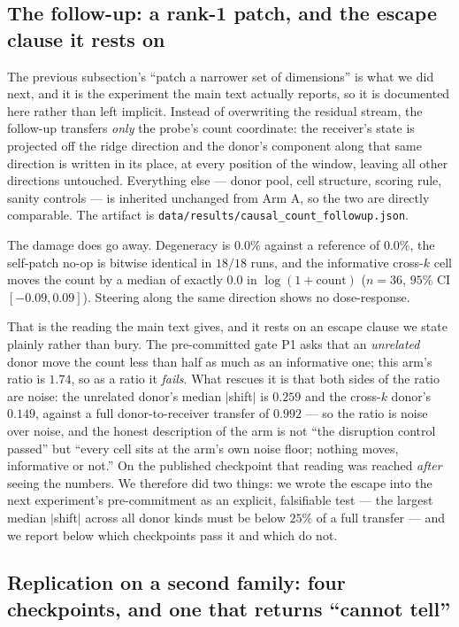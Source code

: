 \documentclass[11pt]{article}
\begin{document}
\subsection{The follow-up: a rank-1 patch, and the escape clause it rests on}

The previous subsection's ``patch a narrower set of dimensions'' is what we did
next, and it is the experiment the main text actually reports, so it is
documented here rather than left implicit. Instead of overwriting the residual
stream, the follow-up transfers \emph{only} the probe's count coordinate: the
receiver's state is projected off the ridge direction and the donor's component
along that same direction is written in its place, at every position of the
window, leaving all other directions untouched. Everything else --- donor pool,
cell structure, scoring rule, sanity controls --- is inherited unchanged from
Arm A, so the two are directly comparable. The artifact is
\texttt{data/results/causal\_count\_followup.json}.

The damage does go away. Degeneracy is $0.0\%$ against a reference of $0.0\%$,
the self-patch no-op is bitwise identical in $18/18$ runs, and the informative
cross-$k$ cell moves the count by a median of exactly $0.0$ in
$\log(1{+}\text{count})$ ($n{=}36$, $95\%$ CI $[-0.09,0.09]$). Steering along
the same direction shows no dose-response.

That is the reading the main text gives, and it rests on an escape clause we
state plainly rather than bury. The pre-committed gate P1 asks that an
\emph{unrelated} donor move the count less than half as much as an informative
one; this arm's ratio is $1.74$, so as a ratio it \emph{fails}. What rescues it
is that both sides of the ratio are noise: the unrelated donor's median
$|$shift$|$ is $0.259$ and the cross-$k$ donor's $0.149$, against a full
donor-to-receiver transfer of $0.992$ --- so the ratio is noise over noise, and
the honest description of the arm is not ``the disruption control passed'' but
``every cell sits at the arm's own noise floor; nothing moves, informative or
not.'' On the published checkpoint that reading was reached \emph{after} seeing
the numbers. We therefore did two things: we wrote the escape into the next
experiment's pre-commitment as an explicit, falsifiable test --- the largest
median $|$shift$|$ across all donor kinds must be below $25\%$ of a full
transfer --- and we report below which checkpoints pass it and which do not.

\subsection{Replication on a second family: four checkpoints, and one that
returns ``cannot tell''}
\end{document}
